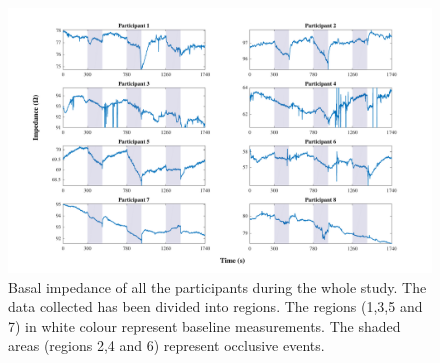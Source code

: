 \begin{figure}[!htbp]  %
	\includegraphics[width=\textwidth,height=\textheight,keepaspectratio]{figure1}    
	\caption[Measurements of the basal impedance during the whole study]{Basal impedance of all the participants during the whole study. The data collected has been divided into regions. The regions (1,3,5 and 7) in white colour represent baseline measurements. The shaded areas (regions 2,4 and 6) represent occlusive events.  }
	\label{fig:rb:all_participants} 
\end{figure}

